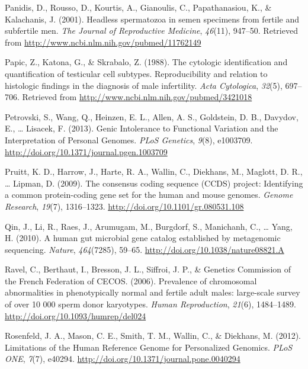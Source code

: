 \documentclass[12pt,twoside]{reedthesis}
\theoremstyle{definition}
\theoremstyle{definition}
\theoremstyle{remark}
\begin{document}
  \hypertarget{ref-Panidis2001}{}
  Panidis, D., Rousso, D., Kourtis, A., Gianoulis, C., Papathanasiou, K.,
  \& Kalachanis, J. (2001). Headless spermatozoa in semen specimens from
  fertile and subfertile men. \emph{The Journal of Reproductive Medicine},
  \emph{46}(11), 947--50. Retrieved from
  \url{http://www.ncbi.nlm.nih.gov/pubmed/11762149}
  
  \hypertarget{ref-Papic}{}
  Papic, Z., Katona, G., \& Skrabalo, Z. (1988). The cytologic
  identification and quantification of testicular cell subtypes.
  Reproducibility and relation to histologic findings in the diagnosis of
  male infertility. \emph{Acta Cytologica}, \emph{32}(5), 697--706.
  Retrieved from \url{http://www.ncbi.nlm.nih.gov/pubmed/3421018}
  
  \hypertarget{ref-Petrovski2013}{}
  Petrovski, S., Wang, Q., Heinzen, E. L., Allen, A. S., Goldstein, D. B.,
  Davydov, E., \ldots{} Lisacek, F. (2013). Genic Intolerance to
  Functional Variation and the Interpretation of Personal Genomes.
  \emph{PLoS Genetics}, \emph{9}(8), e1003709.
  \url{http://doi.org/10.1371/journal.pgen.1003709}
  
  \hypertarget{ref-Pruitt2009}{}
  Pruitt, K. D., Harrow, J., Harte, R. A., Wallin, C., Diekhans, M.,
  Maglott, D. R., \ldots{} Lipman, D. (2009). The consensus coding
  sequence (CCDS) project: Identifying a common protein-coding gene set
  for the human and mouse genomes. \emph{Genome Research}, \emph{19}(7),
  1316--1323. \url{http://doi.org/10.1101/gr.080531.108}
  
  \hypertarget{ref-Qin2010}{}
  Qin, J., Li, R., Raes, J., Arumugam, M., Burgdorf, S., Manichanh, C.,
  \ldots{} Yang, H. (2010). A human gut microbial gene catalog established
  by metagenomic sequencing. \emph{Nature}, \emph{464}(7285), 59--65.
  \url{http://doi.org/10.1038/nature08821.A}
  
  \hypertarget{ref-Ravel2006}{}
  Ravel, C., Berthaut, I., Bresson, J. L., Siffroi, J. P., \& Genetics
  Commission of the French Federation of CECOS. (2006). Prevalence of
  chromosomal abnormalities in phenotypically normal and fertile adult
  males: large-scale survey of over 10 000 sperm donor karyotypes.
  \emph{Human Reproduction}, \emph{21}(6), 1484--1489.
  \url{http://doi.org/10.1093/humrep/del024}
  
  \hypertarget{ref-Rosenfeld2012}{}
  Rosenfeld, J. A., Mason, C. E., Smith, T. M., Wallin, C., \& Diekhans,
  M. (2012). Limitations of the Human Reference Genome for Personalized
  Genomics. \emph{PLoS ONE}, \emph{7}(7), e40294.
  \url{http://doi.org/10.1371/journal.pone.0040294}
  
\end{document}
